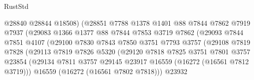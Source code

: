 \begin{lexlean}{RustStd}
\begin{coremodule}
                                  @28840
                                  @28844
                                  @18508)
                                (@28851
                                  @7788
                                  @1378
                                  @1401
                                  @88
                                  @7844
                                  @7862
                                  @7919
                                  @7937
                                  (@29083
                                    @1366
                                    @1377
                                    @88
                                    @7844
                                    @7853
                                    @3719
                                    @7862
                                    (@29093
                                      @7844
                                      @7851
                                      @4107
                                      (@29100
                                        @7830
                                        @7843
                                        @7850
                                        @3751
                                        @7793
                                        @3757
                                        (@29108
                                          @7819
                                          @7828
                                          (@29113
                                            @7819
                                            @7826
                                            @5320
                                            (@29120
                                              @7818
                                              @7825
                                              @3751
                                              @7801
                                              @3757
                                              @23854
                                              (@29134
                                                @7811
                                                @3757
                                                @29145
                                                @23917
                                                @16559
                                                (@16272 (@16561 @7812 @3719)))
                                              @16559
                                              (@16272 (@16561 @7802 @7818)))
                                            @23932

\end{coremodule}
\end{lexlean}
